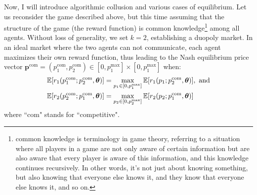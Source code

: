 \documentclass[12pt]{article}
\begin{document}
Now, I will introduce algorithmic collusion and various cases of equilibrium. Let us reconsider the game described above, but this time assuming that the structure of the game (the reward function) is common knowledge\footnote{common knowledge is terminology in game theory, referring to a situation where all players in a game are not only aware of certain information but are also aware that every player is aware of this information, and this knowledge continues recursively. In other words, it's not just about knowing something, but also knowing that everyone else knows it, and they know that everyone else knows it, and so on.} among all agents. Without loss of generality, we set $k=2$, establishing a duopoly market. In an ideal market where the two agents can not communicate, each agent maximizes their own reward function, thus leading to the Nash equilibrium price vector $\mathbf{p}^{\mathrm{com}}=(p_{1}^{\mathrm{com}},p_{2}^{\mathrm{com}})\in[0,p_{1}^{\mathrm{max}}]\times [0,p_{1}^{\mathrm{max}}]$ when:
\begin{align}
    \mathbb{E}[r_1(p_1^{\mathrm{com}};p_2^{\mathrm{com}}, \boldsymbol{\theta})]&=\max_{p_1\in[0,p_1^{\mathrm{max}}]}\mathbb{E}[r_1(p_1;p_2^{\mathrm{com}},\boldsymbol{\theta})],\mathrm{~and} \\
    \mathbb{E}[r_2(p_2^{\mathrm{com}};p_1^{\mathrm{com}}, \boldsymbol{\theta})]&=\max_{p_2\in[0,p_2^{\mathrm{max}}]}\mathbb{E}[r_2(p_2;p_1^{\mathrm{com}},\boldsymbol{\theta})]\notag
\end{align}
where ``com" stands for ``competitive". \\
\end{document}
